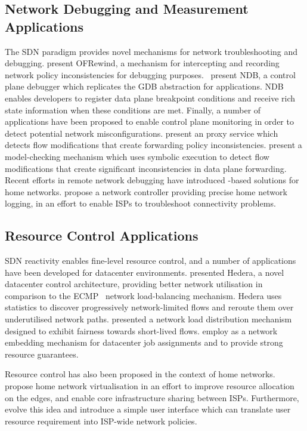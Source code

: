 \subsection{Network Debugging and Measurement Applications}

The SDN paradigm provides novel mechanisms for
network troubleshooting and debugging.  present OFRewind, a mechanism
for intercepting and recording network policy inconsistencies for debugging purposes.
~present NDB, a control plane debugger which replicates the
GDB abstraction for \of applications. NDB enables developers to register data
plane breakpoint conditions and receive rich state information when these
conditions are met.  Finally, a number of applications have been proposed to
enable control plane monitoring in order to detect potential network
misconfigurations.   present an \of proxy service which
detects flow modifications that create forwarding policy inconsistencies.
 present a model-checking mechanism which uses symbolic
execution to detect flow modifications that create significant inconsistencies
in data plane forwarding.  Recent efforts in remote network debugging have
introduced \of-based solutions for home networks.   propose a
network controller providing precise home network logging, in an effort to
enable ISPs to troubleshoot connectivity problems. 

\subsection{Resource Control Applications}

SDN reactivity enables fine-level resource control, and a number of applications
have been developed for datacenter environments.   presented
Hedera, a novel datacenter control architecture, providing better network
utilisation in comparison to the ECMP~ network load-balancing
mechanism. Hedera uses \of statistics to discover progressively
network-limited flows and reroute them over underutilised network paths.
 presented a network load distribution mechanism designed to
exhibit fairness towards short-lived flows.  employ \of as a
network embedding mechanism for datacenter job assignments and to provide strong
resource guarantees.

Resource control has also been proposed in the context of home networks.
 propose home network virtualisation in an effort to improve
resource allocation on the edges, and enable core infrastructure sharing between
ISPs.  Furthermore,  evolve this idea and introduce a simple
user interface which can translate user resource requirement into ISP-wide
network policies. 

